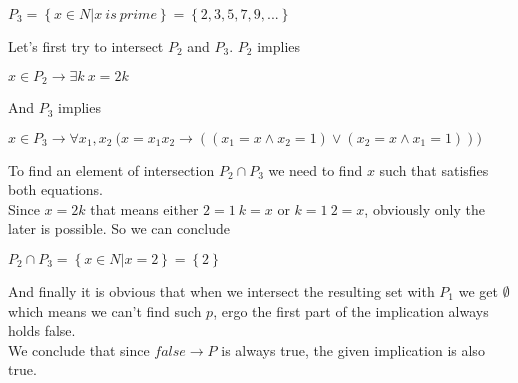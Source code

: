 \documentclass[12pt]{article}
\begin{document}
\begin{center}
$P_3=\left\{{x\in N| x\: is\: prime}\right\}=\left\{{2,3,5,7,9,...}\right\}$
\end{center}
Let's first try to intersect $P_2$ and $P_3$. $P_2$ implies
\begin{center}
$x\in P_2\to \exists k \: x=2k$
\end{center}
And $P_3$ implies
\begin{center}
$x\in P_3\to \forall x_1,x_2\: \big (x=x_1x_2 \to ((x_1=x \wedge x_2=1) \vee (x_2=x\wedge x_1=1))\big)$
\end{center}
To find an element of intersection $P_2\cap P_3$ we need to find $x$ such that satisfies both equations.\\
Since $x=2k$ that means either $2=1\: k=x$ or $k=1\: 2=x$, obviously only the later is possible. So we can conclude
\begin{center}
$P_2\cap P_3=\left\{{x\in N| x=2}\right\}=\left\{{2}\right\}$
\end{center}
And finally it is obvious that when we intersect the resulting set with $P_1$ we get $\emptyset$ which means we can't find such $p$, ergo the first part of the implication always holds false.\\
We conclude that since $false\to P$ is always true, the given implication is also true.
\end{document}

